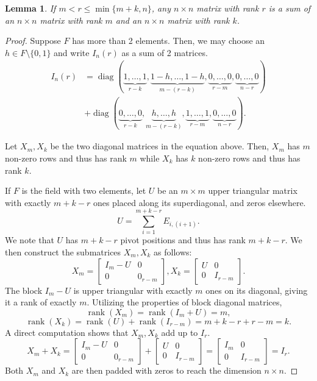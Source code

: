 \documentclass[12pt, a4paper]{amsart}
\newtheorem{lem}[thm]{Lemma}
\theoremstyle{definition}
\numberwithin{equation}{section}
\DeclareMathOperator{\rank}{rank}
\DeclareMathOperator{\diag}{diag}
\begin{document}
\begin{lem} \label{lem:r>m}
    If $m < r \leq \min\{m+k, n\}$, any $n \times n$ matrix with rank $r$ is a sum of an $n \times n$ matrix with rank $m$ and an $n \times n$ matrix with rank $k$.
\end{lem}
\begin{proof}
    Suppose $F$ has more than 2 elements. Then, we may choose an $h \in F \setminus\{0,1\}$ and write $I_n(r)$ as a sum of 2 matrices.
    \begin{align*}
        I_n(r)
        &= \diag(\underbrace{1,\ldots,1}_{r-k},\underbrace{1-h,\ldots,1-h}_{m-(r-k)},\underbrace{0,\ldots,0}_{r-m},\underbrace{0,\ldots,0}_{n-r})\\
        &+ \diag(\underbrace{0,\ldots,0}_{r-k},\underbrace{h,\ldots,h}_{m-(r-k)},\underbrace{1,\ldots,1}_{r-m},\underbrace{0,\ldots,0}_{n-r}).
    \end{align*}

    Let $X_m, X_k$ be the two diagonal matrices in the equation above. Then, $X_m$ has $m$ non-zero rows and thus has rank $m$ while $X_k$ has $k$ non-zero rows and thus has rank $k$.

    If $F$ is the field with two elements, let $U$ be an $m \times m$ upper triangular matrix with exactly $m+k-r$ ones placed along its superdiagonal, and zeros elsewhere.
    \[U = \sum_{i=1}^{m+k-r} E_{i, (i+1)}.\]
    We note that $U$ has $m+k-r$ pivot positions and thus has rank $m+k-r$. We then construct the submatrices $X_m,X_k$ as follows:
    \[
    X_m =
    \begin{bmatrix}
        I_m - U & 0\\
        0 & 0_{r-m}
    \end{bmatrix},
    X_k =
    \begin{bmatrix}
        U & 0\\
        0 & I_{r-m}
    \end{bmatrix}.
    \]
    The block $I_m - U$ is upper triangular with exactly $m$ ones on its diagonal, giving it a rank of exactly $m$. 
    Utilizing the properties of block diagonal matrices,
    \[\rank(X_m) = \rank(I_m + U) = m,\]
    \[\rank(X_k) = \rank(U) + \rank(I_{r-m}) = m+k-r + r -m = k.\]
    A direct computation shows that $X_m,X_k$ add up to $I_r$.
    \[
    X_m + X_k =
    \begin{bmatrix}
        I_m - U & 0\\
        0 & 0_{r-m}
    \end{bmatrix}
    +
    \begin{bmatrix}
        U & 0\\
        0 & I_{r-m}
    \end{bmatrix}
    =
    \begin{bmatrix}
        I_m & 0\\
        0 & I_{r-m}
    \end{bmatrix}
    = I_r.
    \]
    Both $X_m$ and $X_k$ are then padded with zeros to reach the dimension $n\times n$.
\end{proof}
\end{document}
